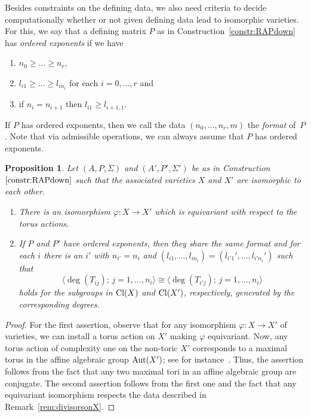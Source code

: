 \documentclass[pdftex]{sigma}%
\newtheorem{prop}[thm]{Proposition}
\theoremstyle{definition}
\def\Cl{{\rm Cl}}
\def\bangle#1{{\langle #1 \rangle}}
\def\Aut{{\rm Aut}}
\numberwithin{equation}{section}
\begin{document}
Besides constraints on the defining data,
we also need criteria to decide computationally
whether or not given defining data lead to
isomorphic varieties.
For this, we say that a defining matrix $P$ as in
Construction~\ref{constr:RAPdown}
has \emph{ordered exponents} if
we have
\begin{enumerate}\itemsep=0pt
 \item[$(i)$] $n_0 \ge \dots \ge n_r$,
 \item[$(ii)$] $l_{i1} \ge \dots \ge l_{in_i}$ for each $i = 0, \dots, r$ and
 \item[$(iii)$] if $n_i = n_{i+1}$ then $l_{i1} \ge l_{i+1, 1}$.
\end{enumerate}
If $P$ has ordered exponents,
then we call the data
$(n_0, \dots, n_r,m)$
the \emph{format} of~$P$.
Note that via admissible operations,
we can always assume that $P$ has ordered
exponents.

\begin{prop}
\label{prop:non-iso-crit}
Let $(A,P,\Sigma)$ and $(A',P',\Sigma')$
be as in Construction~$\ref{constr:RAPdown}$
such that the associated varieties
$X$ and $X'$ are isomorphic to each other.
\begin{enumerate}\itemsep=0pt
\item[$(i)$]
There is an isomorphism $\varphi \colon X \to X'$
which is equivariant with respect to the torus
actions.
\item[$(ii)$]
If $P$ and $P'$ have ordered exponents, then
they share the same format and for each $i$
there is an $i'$ with $n_{i'} = n_i$ and
$(l_{i1}, \dots, l_{in_i}) = (l_{i'1}', \dots, l_{i'n_i}')$
such that
\[
\bangle{\deg(T_{ij}); \, j = 1, \dots, n_i}
 \cong
\bangle{\deg(T_{i'j}); \, j = 1, \dots, n_i}
\]
holds for the subgroups in $\Cl(X)$
and $\Cl(X')$, respectively, generated by the
corresponding degrees.
\end{enumerate}
\end{prop}



\begin{proof}
For the first assertion, observe that for
any isomorphism $\varphi \colon X \to X'$
of varieties, we can install a torus action
on $X'$ making $\varphi$ equivariant.
Now, any torus action of complexity one on
the non-toric $X'$ corresponds to a maximal
torus in the affine algebraic group $\Aut(X')$;
see for instance~\cite[Theorem~2.1]{ArHaHeLi}.
Thus, the assertion follows from the fact that
any two maximal tori in an affine algebraic
group are conjugate.
The second assertion follows from the first one
and the fact that any equivariant isomorphism
respects the data described in
Remark~\ref{rem:divisorsonX}.
\end{proof}
\end{document}
